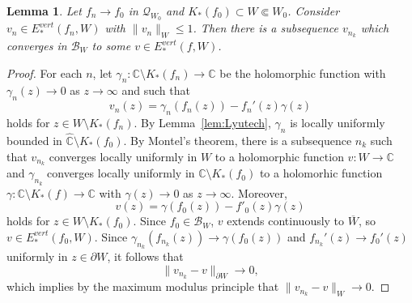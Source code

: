 \documentclass{amsart}
\numberwithin{equation}{section}
\newtheorem{lemma}[theorem]{Lemma}%
\newcommand{\C}{\mathbb C}
\theoremstyle{definition}
\theoremstyle{remark}
\begin{document}

\begin{lemma}\label{lem:vertcomp} Let $f_n\to f_0$ in $\mathcal{Q}_{W_0}$ and $K_*(f_0)\subset W\Subset W_0$. Consider $v_n\in E^{vert}_*(f_n,W)$ with $\|v_n\|_{W}\le 1$. Then there is a subsequence $v_{n_k}$ which converges in $\mathcal{B}_{W}$ to some $v\in E^{vert}_*(f,W)$.
\end{lemma}
\begin{proof} For each $n$, let $\gamma_n:\mathbb{C}\setminus K_*(f_n)\to \mathbb{C}$ be the holomorphic function with $\gamma_n(z)\to 0$ as $z\to\infty$ and such that 
$$v_n(z)=\gamma_n(f_n(z))-f_n'(z)\gamma(z)$$
holds for $z\in W\setminus K_*(f_n)$. By Lemma~\ref{lem:Lyutech}, $\gamma_n$ is locally uniformly bounded in $\widehat{\C}\setminus K_*(f_0)$. By Montel's theorem, there is a subsequence $n_k$ such that $v_{n_k}$ converges locally uniformly in $W$ to a holomorphic function $v:W\to \C$ and $\gamma_{n_k}$ converges locally uniformly in $\C\setminus K_*(f_0)$ to a holomorhic function $\gamma:\C\setminus K_*(f)\to \C$ with $\gamma(z)\to 0$ as $z\to\infty$. Moreover, 
$$v(z)=\gamma(f_0(z))-f'_0(z)\gamma(z)$$
holds for $z\in W\setminus K_*(f_0)$. Since $f_0\in \mathcal{B}_{W}$, $v$ extends continuously to $\overline{W}$, so $v\in E^{vert}_*(f_0,W)$.
Since $\gamma_{n_k}(f_{n_k}(z))\to \gamma(f_0(z))$ and $f_{n_k}'(z)\to f_0'(z)$ uniformly in $z\in \partial W$, it follows that 
$$\|v_{n_k}-v\|_{\partial W}\to 0,$$
which implies by the maximum modulus principle that $\|v_{n_k}-v\|_{W}\to 0$.
\end{proof}
\end{document}
